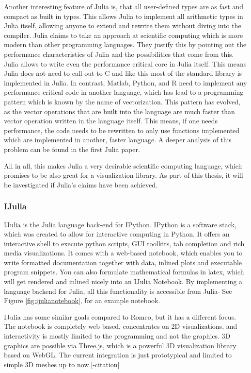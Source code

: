 Another interesting feature of Julia is, that all user-defined types are as fast and compact as built in types.
This allows Julia to implement all arithmetic types in Julia itself, allowing anyone to extend and rewrite them without diving into the compiler.
Julia claims to take an approach at scientific computing which is more modern than other programming languages.
They justify this by pointing out the performance characteristics of Julia and the possibilities that come from this. 
Julia allows to write even the performance critical core in Julia itself. This means Julia does not need to call out to C and like this most of the standard library is implemented in Julia. 
In contrast, Matlab, Python, and R need to implement any performance-critical code in another language, which has lead to a programming pattern which is known by the name of vectorization. This pattern has evolved, as the vector operations that are built into the language are much faster than vector operation written in the language itself.
This means, if one needs performance, the code needs to be rewritten to only use functions implemented which are implemented in another, faster language.
A deeper analysis of this problem can be found in the first Julia paper\cite{2012arXiv1209.5145B}.

All in all, this makes Julia a very desirable scientific computing language, which promises to be also great for a visualization library.
As part of this thesis, it will be investigated if Julia's claims have been achieved.



\subsubsection{IJulia}
IJulia is the Julia language back-end for IPython.
IPython is a software stack, which was created to allow for interactive computing in Python.
It offers an interactive shell to execute python scripts, \ac{GUI} toolkits, tab completion and rich media visualizations.
It comes with a web-based notebook, which enables you to write formatted documentation together with data, inlined plots and executable program snippets. You can also formulate mathematical formulas in latex, which will get rendered and inlined nicely into an IJulia Notebook. By implementing a language backend for Julia, all this functionality is accessible from Julia-
See Figure \ref{fig:ijulianotebook}, for an example notebook.

IJulia has some similar goals compared to Romeo, but it has a different focus.
The notebook is completely web based, concentrates on 2D visualizations, and interactivity is mostly limited to the programming and not the graphics.
3D graphics are possible via Three.js, which is a powerful 3D visualization library based on WebGL.
The current integration is just prototypical and limited to simple 3D meshes up to now.[-citation]


